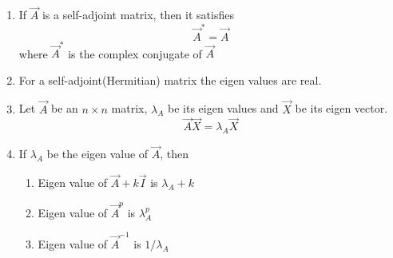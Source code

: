 \begin{enumerate}
\item If $\vec{A}$ is a self-adjoint matrix, then it satisfies 
\begin{equation}\label{eq:solutions/2018/dec/30/2.0.1}
\vec{A}^{*} = \vec{A}
\end{equation}
where $\vec{A}^{*}$ is the complex conjugate of $\vec{A}$
\item For a self-adjoint(Hermitian) matrix the eigen values are real.
\item Let $\vec{A}$ be an $n \times n$ matrix, $\lambda_A$ be its eigen values and $\vec{X}$ be its eigen vector.
\begin{equation}\label{eq:solutions/2018/dec/30/2.0.2}
\vec{A}\vec{X} = \lambda_A \vec{X} 
\end{equation}
\item If $\lambda_A$ be the eigen value of $\vec{A}$, then 
\begin{enumerate}
 \item Eigen value of $\vec{A}+k\vec{I}$ is $\lambda_A+k$
 \item Eigen value of $\vec{A}^p$ is $\lambda_A^p$
 \item Eigen value of $\vec{A}^{-1}$ is $1/\lambda_A$
\end{enumerate}
\end{enumerate}
